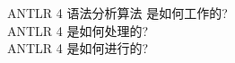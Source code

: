 
\begin{frame}{}
  \begin{center}
    ANTLR 4 语法分析算法  是如何工作的? \\[40pt]
    \pause
    ANTLR 4 是如何处理的? \\[40pt]
    \pause
    ANTLR 4 是如何进行的?
  \end{center}
\end{frame}
